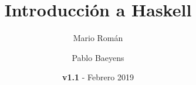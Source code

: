 \documentclass[paper=a4, fontsize=11pt, spanish]{tufte-handout}
\title{Introducción a Haskell}
\author{Mario Román \and Pablo Baeyens} %
\date{\textbf{v1.1} - Febrero 2019}
\newcommand{\seccion}[1]{} %
\begin{document}
\maketitle

\seccion{ghc}
\seccion{tipos}
\seccion{constr}
\seccion{funciones}
\seccion{defTipos}
\newpage
\seccion{apendice}
\end{document}
